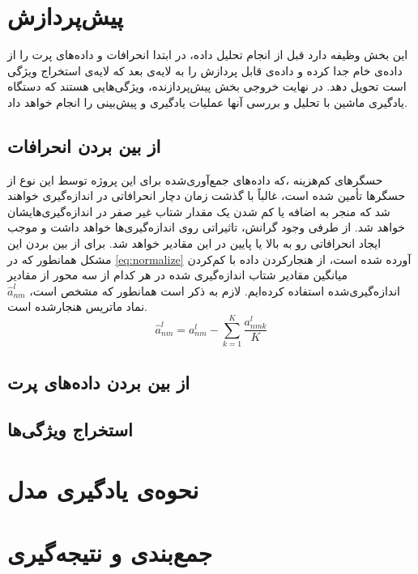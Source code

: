 \section{پیش‌پردازش}
این بخش وظیفه دارد قبل از انجام تحلیل داده، در ابتدا انحرافات و داده‌های پرت را از داده‌ی خام جدا کرده و داده‌ی قابل پردازش را به لایه‌ی بعد که لایه‌ی استخراج ویژگی‌ است تحویل دهد. در نهایت خروجی بخش پیش‌پردازنده، ویژگی‌هایی هستند که دستگاه یادگیری ماشین با تحلیل و بررسی آنها عملیات یادگیری و پیش‌بینی را انجام خواهد داد.

\subsection{از بین بردن انحرافات}
 حسگرهای کم‌هزینه  ،که داده‌های جمع‌آوری‌شده برای این پروژه توسط این نوع از حسگرها تأمین شده است، غالباً با گذشت زمان دچار انحرافاتی در اندازه‌گیری خواهند شد که منجر به اضافه یا کم شدن یک مقدار شتاب غیر صفر در اندازه‌گیری‌هایشان خواهد شد. از طرفی وجود گرانش، تاثیراتی روی اندازه‌گیری‌ها خواهد داشت و موجب ایجاد انحرافاتی رو به بالا یا پایین در این مقادیر خواهد شد\cite{jung2017vibration}. برای از بین بردن این مشکل همانطور که در \cref{eq:normalize} آورده شده است\cite{garcia2015data}، از هنجار‌کردن داده با کم‌کردن میانگین مقادیر شتاب اندازه‌گیری شده در هر کدام از سه محور از مقادیر اندازه‌گیری‌شده استفاده کرده‌ایم. لازم به ذکر است همانطور که مشخص است، $\hat{a}^l_{nm}$ نماد ماتریس هنجار‌شده است.
\begin{equation}
\label{eq:normalize}
	\hat{a}^l_{nm}=a^l_{nm}-\sum_{k=1}^K \dfrac{a^l_{nmk}}{K}
\end{equation}


\subsection{از بین بردن داده‌های پرت}


\subsection{استخراج ویژگی‌ها}


\section{نحوه‌ی یادگیری مدل}


\section{جمع‌بندی و نتیجه‌گیری}